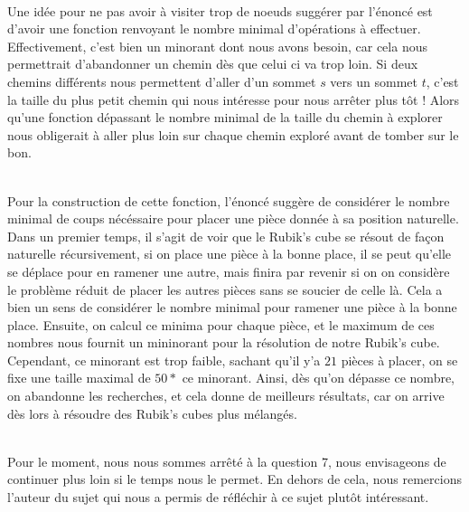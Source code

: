 \documentclass[a4paper,11pt]{article}
\theoremstyle{mytheor}
\begin{document}
\\
Une idée pour ne pas avoir à visiter trop de noeuds suggérer par l'énoncé est d'avoir une fonction renvoyant le nombre minimal d'opérations à effectuer. Effectivement, c'est bien un minorant dont nous avons besoin, car cela nous permettrait d'abandonner un chemin dès que celui ci va trop loin. Si deux chemins différents nous permettent d'aller d'un sommet $s$ vers un sommet $t$, c'est la taille du plus petit chemin qui nous intéresse pour nous arrêter plus tôt ! Alors qu'une fonction dépassant le nombre minimal de la taille du chemin à explorer nous obligerait à aller plus loin sur chaque chemin exploré avant de tomber sur le bon.

\\
Pour la construction de cette fonction, l'énoncé suggère de considérer le nombre minimal de coups  nécéssaire pour placer une pièce donnée à sa position naturelle. Dans un premier temps, il s'agit de voir que le Rubik's cube se résout de façon naturelle récursivement, si on place une pièce à la bonne place, il se peut qu'elle se déplace pour en ramener une autre, mais finira par revenir si on on considère le problème réduit de placer les autres pièces sans se soucier de celle là. Cela a bien un sens de considérer le nombre minimal pour ramener une pièce à la bonne place. Ensuite, on calcul ce minima pour chaque pièce, et le maximum de ces nombres nous fournit un mininorant pour la résolution de notre Rubik's cube. Cependant, ce minorant est trop faible, sachant qu'il y'a $21$ pièces à placer, on se fixe une taille maximal de $50 *$ ce minorant. Ainsi, dès qu'on dépasse ce nombre, on abandonne les recherches, et cela donne de meilleurs résultats, car on arrive dès lors à résoudre des Rubik's cubes plus mélangés.

\\
Pour le moment, nous nous sommes arrêté à la question 7, nous envisageons de continuer plus loin si le temps nous le permet. En dehors de cela, nous remercions l'auteur du sujet qui nous a permis de réfléchir à ce sujet plutôt intéressant.
\end{document}
